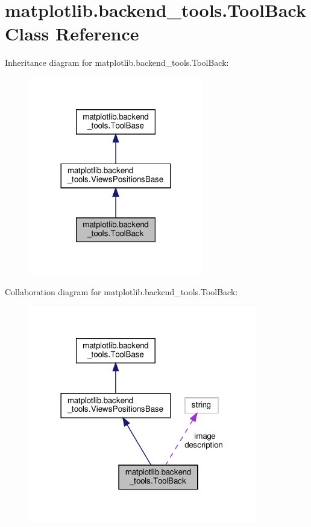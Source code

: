 \hypertarget{classmatplotlib_1_1backend__tools_1_1ToolBack}{}\section{matplotlib.\+backend\+\_\+tools.\+Tool\+Back Class Reference}
\label{classmatplotlib_1_1backend__tools_1_1ToolBack}


Inheritance diagram for matplotlib.\+backend\+\_\+tools.\+Tool\+Back\+:
\nopagebreak
\begin{figure}[H]
\begin{center}
\leavevmode
\includegraphics[width=216pt]{classmatplotlib_1_1backend__tools_1_1ToolBack__inherit__graph}
\end{center}
\end{figure}


Collaboration diagram for matplotlib.\+backend\+\_\+tools.\+Tool\+Back\+:
\nopagebreak
\begin{figure}[H]
\begin{center}
\leavevmode
\includegraphics[width=282pt]{classmatplotlib_1_1backend__tools_1_1ToolBack__coll__graph}
\end{center}
\end{figure}
